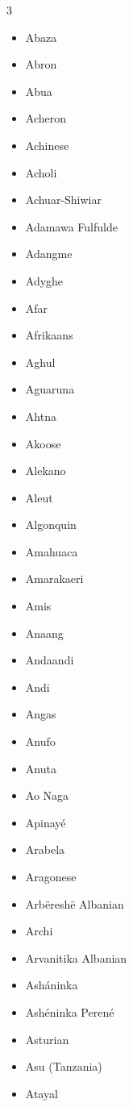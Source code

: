 \documentclass[paper=a4, 10pt]{scrbook}
\begin{document}
\begin{multicols}{3}
    \raggedright
    \begin{itemize}
        \item Abaza
        \item Abron
        \item Abua
        \item Acheron
        \item Achinese
        \item Acholi
        \item Achuar-Shiwiar
        \item Adamawa Fulfulde
        \item Adangme
        \item Adyghe
        \item Afar
        \item Afrikaans
        \item Aghul
        \item Aguaruna
        \item Ahtna
        \item Akoose
        \item Alekano
        \item Aleut
        \item Algonquin
        \item Amahuaca
        \item Amarakaeri
        \item Amis
        \item Anaang
        \item Andaandi
        \item Andi
        \item Angas
        \item Anufo
        \item Anuta
        \item Ao Naga
        \item Apinayé
        \item Arabela
        \item Aragonese
        \item Arbëreshë Albanian
        \item Archi
        \item Arvanitika Albanian
        \item Asháninka
        \item Ashéninka Perené
        \item Asturian
        \item Asu (Tanzania)
        \item Atayal

\end{itemize}
\end{multicols}
\end{document}
